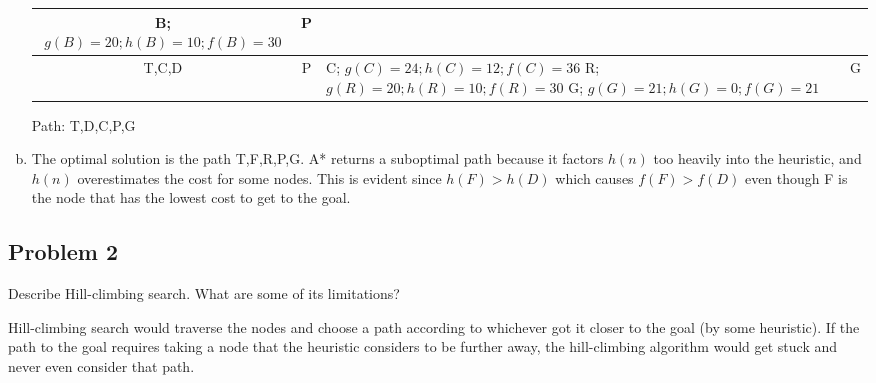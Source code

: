 \documentclass{math}
\begin{document}
\begin{enumerate}[(a)]
\begin{center}
\begin{tabular}{|c|c|p{8cm}|c|}
        B; \( g(B) = 20; h(B) = 10; f(B) = 30 \)
        & P \\ \hline
      T,C,D & P &
        C; \( g(C) = 24; h(C) = 12; f(C) = 36 \) \newline
        R; \( g(R) = 20; h(R) = 10; f(R) = 30 \) \newline
        G; \( g(G) = 21; h(G) = 0; f(G) = 21 \)
        & G \\ \hline
    \end{tabular}
  \end{center}
  Path: T,D,C,P,G
  \item The optimal solution is the path T,F,R,P,G. A* returns a suboptimal
  path because it factors \( h(n) \) too heavily into the heuristic, and
  \( h(n) \) overestimates the cost for some nodes. This is evident since
  \( h(F) > h(D) \) which causes \( f(F) > f(D) \) even though F is the node
  that has the lowest cost to get to the goal.
\end{enumerate}

\subsection*{Problem 2}
Describe Hill-climbing search. What are some of its limitations?
\par Hill-climbing search would traverse the nodes and choose a path according
to whichever got it closer to the goal (by some heuristic). If the path to the
goal requires taking a node that the heuristic considers to be further away,
the hill-climbing algorithm would get stuck and never even consider that path.
\end{document}

